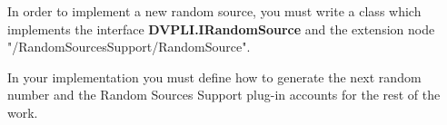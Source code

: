In order to implement a new random source, you must write a
class which implements the interface \textbf{DVPLI.IRandomSource} and the extension node "/RandomSourcesSupport/RandomSource". 

In your implementation you must define how to generate the next random number and the Random Sources Support plug-in accounts for the rest of the work.






